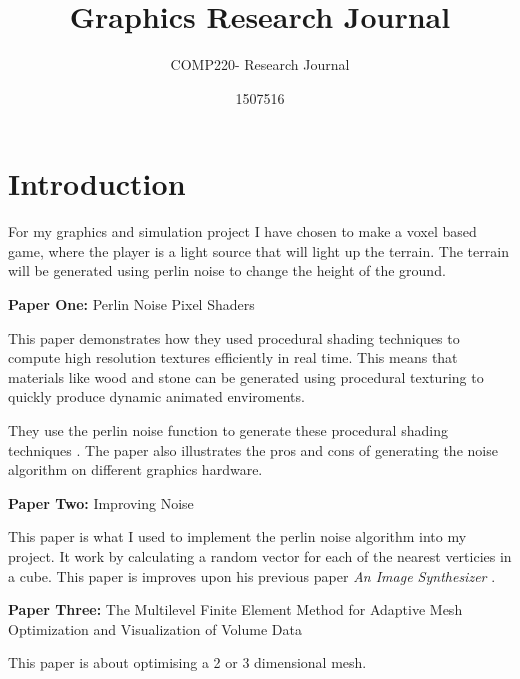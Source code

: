 \documentclass{scrartcl}
\title{Graphics Research Journal}
\subtitle{COMP220- Research Journal}
\author{1507516}
\begin{document}
\maketitle

\abstract{}

\section{Introduction}
For my graphics and simulation project I have chosen to make a voxel based game, where the player is a light source that will light up the terrain. The terrain will be generated using perlin noise \cite{perlin1985image} to change the height of the ground.

\textbf{Paper One:}
Perlin Noise Pixel Shaders
\cite{hart2001perlin}
\par

This paper demonstrates how they used procedural shading techniques to compute high resolution textures efficiently in real time. This means that materials like wood and stone can be generated using procedural texturing to quickly produce dynamic animated enviroments.

They use the perlin noise function to generate these procedural shading techniques \cite{perlin2002improving}. The paper also illustrates the pros and cons of generating the noise algorithm on different graphics hardware.

\par




\textbf{Paper Two:}
Improving Noise
\cite{perlin2002improving}
\par

This paper is what I used to implement the perlin noise algorithm into my project. It work by calculating a random vector for each of the nearest verticies in a cube.
This paper is improves upon his previous paper \textit{An Image Synthesizer} \cite{perlin1985image}.

\par 





\textbf{Paper Three:}
The Multilevel Finite Element Method for Adaptive Mesh
Optimization and Visualization of Volume Data
\cite{grosso1997multilevel}
\par

This paper is about optimising a 2 or 3 dimensional mesh. 
\end{document}
